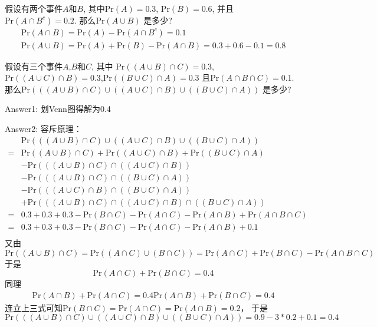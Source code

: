 \exer 假设有两个事件$A$和$B$, 其中$\mathrm{Pr}(A) = 0.3$, $\mathrm{Pr}(B) = 0.6$, 并且 $\mathrm{Pr}(A \cap B^c) =
0.2$. 那么$\mathrm{Pr}(A \cup B)$ 是多少?
\begin{gather*}
    \mathrm{Pr}(A\cap B) = \mathrm{Pr}(A) - \mathrm{Pr}(A\cap B^c) = 0.1 \\
    \mathrm{Pr}(A \cup B) = \mathrm{Pr}(A) + \mathrm{Pr}(B) - \mathrm{Pr}(A \cap B) = 0.3 + 0.6 - 0.1 = 0.8
\end{gather*}

\exer 假设有三个事件$A$,$B$和$C$, 其中 $\mathrm{Pr}((A\cup B)\cap C) = 0.3$,$\mathrm{Pr}((A\cup C)\cap B) = 0.3$,$\mathrm{Pr}((B\cup C) ∩ A) = 0.3$ 且$\mathrm{Pr}(A\cap B\cap C) = 0$.1. 那么$\mathrm{Pr}(((A\cup B)\cap C)\cup ((A\cup C)\cap
B)\cup ((B\cup C)\cap A))$ 是多少?\par
Answer1: 划Venn图得解为0.4\par
Answer2: 容斥原理：
\begin{align*}
    & \mathrm{Pr}(((A\cup B)\cap C)\cup ((A\cup C)\cap
    B)\cup ((B\cup C)\cap A)) \\
    =& \mathrm{Pr}((A\cup B)\cap C) + \mathrm{Pr}((A\cup C)\cap B) + \mathrm{Pr}((B\cup C)\cap A) \\
    &-\mathrm{Pr}(((A\cup B)\cap C)\cap ((A\cup C)\cap B)) \\
    &-\mathrm{Pr}(((A\cup B)\cap C)\cap ((B\cup C)\cap A)) \\
    &-\mathrm{Pr}(((A\cup C)\cap B)\cap ((B\cup C)\cap A)) \\
    & + \mathrm{Pr}(((A\cup B)\cap C)\cap ((A\cup C)\cap B)\cap ((B\cup C)\cap A)) \\
    =&0.3+0.3+0.3-\mathrm{Pr}(B\cap C)-\mathrm{Pr}(A\cap C)-\mathrm{Pr}(A\cap B)+\mathrm{Pr}(A\cap B\cap C) \\
    =&0.3+0.3+0.3-\mathrm{Pr}(B\cap C)-\mathrm{Pr}(A\cap C)-\mathrm{Pr}(A\cap B)+0.1 \\
\end{align*}
又由$\mathrm{Pr}((A\cup B)\cap C)=\mathrm{Pr}((A\cap C)\cup (B\cap C))=\mathrm{Pr}(A\cap C) + \mathrm{Pr}(B\cap C) - \mathrm{Pr}(A\cap B\cap C)$
于是
\[\mathrm{Pr}(A\cap C) + \mathrm{Pr}(B\cap C) = 0.4\]
同理
\begin{gather*}
\mathrm{Pr}(A\cap B) + \mathrm{Pr}(A\cap C) = 0.4
\mathrm{Pr}(A\cap B) + \mathrm{Pr}(B\cap C) = 0.4
\end{gather*}
连立上三式可知$\mathrm{Pr}(B\cap C)=\mathrm{Pr}(A\cap C)=\mathrm{Pr}(A\cap B) = 0.2$，
于是
\[\mathrm{Pr}(((A\cup B)\cap C)\cup ((A\cup C)\cap
    B)\cup ((B\cup C)\cap A)) =0.9 - 3*0.2 + 0.1  = 0.4\]

